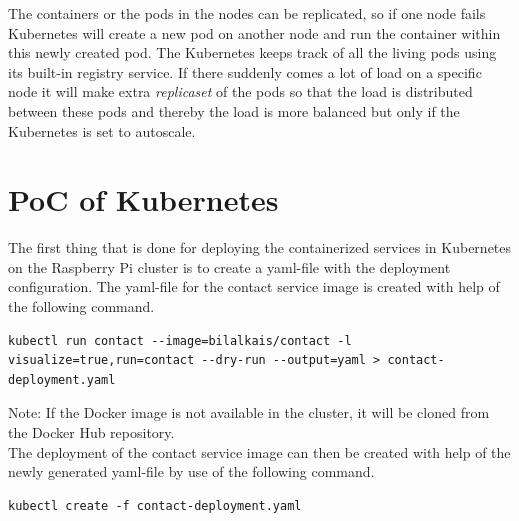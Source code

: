 The containers or the pods in the nodes can be replicated, so if one node fails Kubernetes will create a new pod on another node and run the container within this newly created pod. The Kubernetes keeps track of all the living pods using its built-in registry service.  
If there suddenly comes a lot of load on a specific node it will make extra \emph{replicaset} of the pods so that the load is distributed between these pods and thereby the load is more balanced but only if the Kubernetes is set to autoscale. 

\section{PoC of Kubernetes}




The first thing that is done for deploying the containerized services in Kubernetes on the Raspberry Pi cluster is to create a  yaml-file with the deployment configuration. The yaml-file for \eg the contact service image is created with help of the following command. 
\begin{lstlisting}[frame=single, ]
kubectl run contact --image=bilalkais/contact -l visualize=true,run=contact --dry-run --output=yaml > contact-deployment.yaml
\end{lstlisting}
Note: If the Docker image is not available in the cluster, it will be cloned from the Docker Hub repository.\\

The deployment of the contact service image can then be created with help of the newly generated yaml-file by use of the following command.
\begin{lstlisting}[frame=single, ]
kubectl create -f contact-deployment.yaml
\end{lstlisting}

